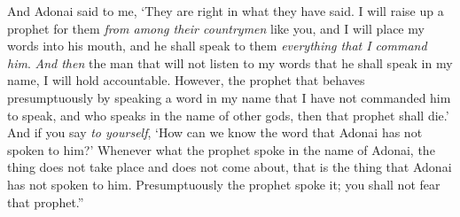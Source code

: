 \begin{biblechapter}
\verse And Adonai said to me, ‘They are right in what they have said.
\verse I will raise up a prophet for them \textit{from among their countrymen} like you, and I will place my words into his mouth, and he shall speak to them \textit{everything that I command him}.
\verse \textit{And then} the man that will not listen to my words that he shall speak in my name, I will hold accountable.
\verse However, the prophet that behaves presumptuously by speaking a word in my name that I have not commanded him to speak, and who speaks in the name of other gods, then that prophet shall die.’
\verse And if you say \textit{to yourself}, ‘How can we know the word that Adonai has not spoken to him?’
\verse Whenever what the prophet spoke in the name of Adonai, the thing does not take place and does not come about, that is the thing that Adonai has not spoken to him. Presumptuously the prophet spoke it; you shall not fear that prophet.”
\end{biblechapter}

